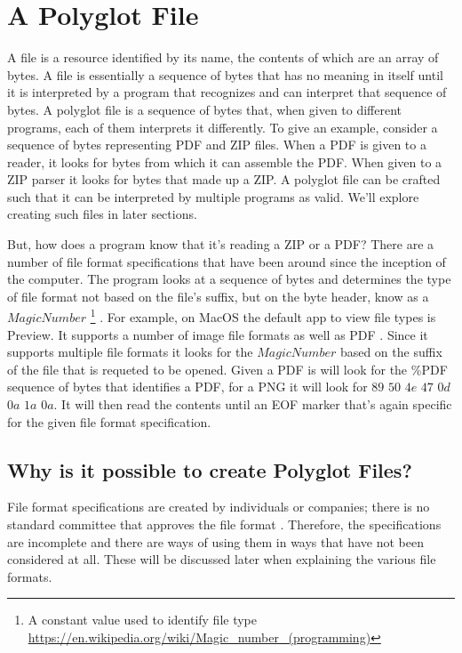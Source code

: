 \section{A Polyglot File}
A file is a resource identified by its name, the contents of which are an array of bytes\cite{File}. 
A file is essentially a sequence of bytes that has no meaning in itself until it is interpreted by a program that recognizes and can interpret that sequence of bytes. 
A polyglot file is a sequence of bytes that, when given to different programs, each of them interprets it differently. To give an example, consider a sequence of bytes representing PDF and ZIP files. 
When a PDF is given to a reader, it looks for bytes from which it can assemble the PDF. When given to a ZIP parser
it looks for bytes that made up a ZIP. A polyglot file can be crafted such that it can be interpreted by multiple programs as valid.
We'll explore creating such files in later sections.

But, how does a program know that it's reading a ZIP or a PDF? 
There are a number of file format specifications that have been around since the inception of the computer. 
The program looks at a sequence of bytes and determines the type of file format not based on the file's suffix, but on the byte header,
know as a $Magic Number$ \footnote{A constant value used to identify file type \url{https://en.wikipedia.org/wiki/Magic_number_(programming)}} \cite{PolyglotFile}.
For example, on MacOS the default app to view file types is Preview. It supports a number of image file formats as well as PDF \cite{Preview}. Since it supports multiple file formats it looks for the
$Magic Number$ based on the suffix of the file that is requeted to be opened. Given a PDF is will look for the \%PDF sequence of bytes that identifies a PDF, for a PNG it will look for $89$ $50$ $4e$ $47$ $0d$ $0a$ $1a$ $0a$.
It will then read the contents until an EOF marker that's again specific for the given file format specification.

\subsection{Why is it possible to create Polyglot Files?}
File format specifications are created by individuals or companies; there is no standard committee that approves the file format \cite{Ange-Albertini}.
Therefore, the specifications are incomplete and there are ways of using them in ways that have not been considered at all. These will be discussed later when explaining the various file formats.

